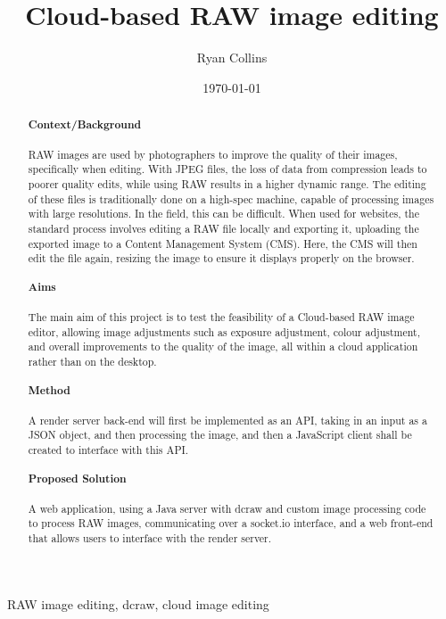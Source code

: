\documentclass[12pt,a4paper]{article}
\title{Cloud-based RAW image editing}
\author{Ryan Collins}
\date{\today}
\begin{document}
\maketitle

\begin{abstract}
\paragraph{Context/Background}
RAW images are used by photographers to improve the quality of their images, specifically when editing. With JPEG files, the loss of data from compression leads to poorer quality edits, while using RAW results in a higher dynamic range. The editing of these files is traditionally done on a high-spec machine, capable of processing images with large resolutions. In the field, this can be difficult. When used for websites, the standard process involves editing a RAW file locally and exporting it, uploading the exported image to a Content Management System (CMS). Here, the CMS will then edit the file again, resizing the image to ensure it displays properly on the browser.
\paragraph{Aims}
The main aim of this project is to test the feasibility of a Cloud-based RAW image editor, allowing image adjustments such as exposure adjustment, colour adjustment, and overall improvements to the quality of the image, all within a cloud application rather than on the desktop.
\paragraph{Method}
A render server back-end will first be implemented as an API, taking in an input as a JSON object, and then processing the image, and then a JavaScript client shall be created to interface with this API.
\paragraph{Proposed Solution}
A web application, using a Java server with dcraw and custom image processing code to process RAW images, communicating over a socket.io interface, and a web front-end that allows users to interface with the render server.
\end{abstract}

\begin{keywords}
RAW image editing, dcraw, cloud image editing
\end{keywords}
\end{document}
